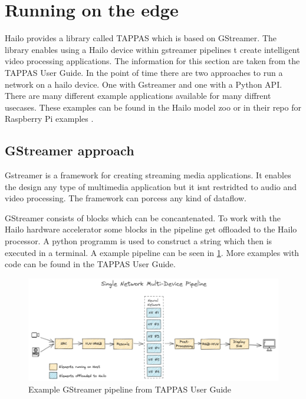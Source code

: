 \section{Running on the edge}

Hailo provides a library called TAPPAS which is based on GStreamer.
The library enables using a Hailo device within gstreamer pipelines t create intelligent video processing applications.
The information for this section are taken from the TAPPAS User Guide.
In the point of time there are two approaches to run a network on a hailo device.
One with Gstreamer and one with a Python API.
There are many different example applications available for many diffrent usecases.
These examples can be found in the Hailo model zoo\cite{hailo_model_zoo} or in their repo for Raspberry Pi examples \cite{hailo_rpi5_examples}.


\subsection{GStreamer approach}

Gstreamer is a framework for creating streaming media applications.
It enables the design any type of multimedia application but it isnt restridted to audio and video processing.
The framework can porcess any kind of dataflow.

GStreamer consists of blocks which can be concantenated.
To work with the Hailo hardware accelerator some blocks in the pipeline get offloaded to the Hailo processor.
A python programm is used to construct a string which then is executed in a terminal.
A example pipeline can be seen in \cref{fig:hardware:gstreamerpipeline}.
More examples with code can be found in the TAPPAS User Guide.
\begin{figure}[!h]
    \centering
    \includegraphics[width=\textwidth]{Images/Hardware/gstreamerExample.png}
    \caption{Example GStreamer pipeline from TAPPAS User Guide}
    \label{fig:hardware:gstreamerpipeline}
\end{figure}

